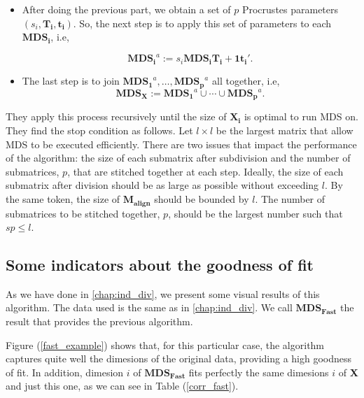\documentclass[11pt]{report}
\begin{document}
\begin{itemize}
\item After doing the previous part, we obtain a set of $p$ Procrustes 
parameters $(s_i, \mathbf{T_i},  \mathbf{t_i})$. So, the next step is to 
apply this set of parameters to each $\mathbf{MDS_i}$, i.e, 

\[
\mathbf{MDS_i}^a := s_i \mathbf{MDS_i} \mathbf{T_i} + \mathbf{1t_i'}.
\]

\item The last step is to join $\mathbf{MDS_1}^a, \dots,  \mathbf{MDS_p}^a$ 
all together, i.e, 
\[
\mathbf{MDS_X}:= \mathbf{MDS_1}^a \cup \cdots \cup \mathbf{MDS_p}^a.
\]

\end{itemize}

\indent They apply this process recursively until the size of $\mathbf{X_i}$ is
optimal to run MDS on. They find the stop condition as follows. Let 
$l \times l$ be the largest matrix that allow MDS to be executed efficiently. 
There are two issues that impact the performance of the algorithm: the size of 
each submatrix after subdivision and the number of submatrices, $p$, that are 
stitched together at each step. Ideally, the size of each submatrix after 
division should be as large as possible without exceeding $l$. By the same
token, the size of $\mathbf{M_{align}}$ should be bounded by $l$. The number of 
submatrices to be stitched together, $p$, should be the largest number such 
that $sp \leq l$.

\subsection{Some indicators about the goodness of fit}
As we have done in \autoref{chap:ind_div}, we present some visual results of
this algorithm. The data used is the same as in \autoref{chap:ind_div}. We
call $\mathbf{MDS_{Fast}}$ the result that provides the previous algorithm.

\indent Figure (\ref{fast_example}) shows that, for this particular case,
the algorithm captures quite well the dimesions of the original data, 
providing a high goodness of fit. In addition, dimesion $i$ of 
$\mathbf{MDS_{Fast}}$ fits perfectly the same dimesions $i$ of \textbf{X} and 
just this one, as we can see in Table (\ref{corr_fast}).
\end{document}

